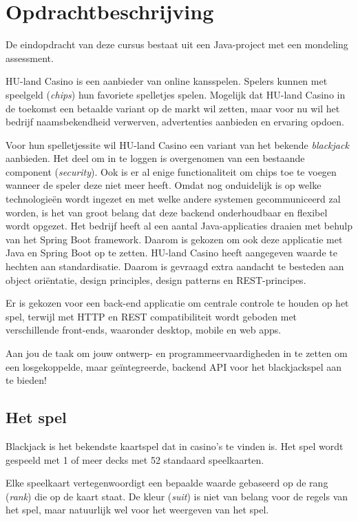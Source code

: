 \chapter{Opdrachtbeschrijving}

De eindopdracht van deze cursus bestaat uit een Java-project met een mondeling assessment.

HU-land Casino is een aanbieder van online kansspelen. 
Spelers kunnen met speelgeld (\textit{chips}) hun favoriete spelletjes spelen. 
Mogelijk dat HU-land Casino in de toekomst een betaalde variant op de markt wil zetten, 
maar voor nu wil het bedrijf naamsbekendheid verwerven, advertenties aanbieden en ervaring opdoen. 

Voor hun spelletjessite wil HU-land Casino een variant van het bekende \textit{blackjack} aanbieden. 
Het deel om in te loggen is overgenomen van een bestaande component (\textit{security}). 
Ook is er al enige functionaliteit om chips toe te voegen wanneer de speler deze niet meer heeft. 
Omdat nog onduidelijk is op welke technologieën wordt ingezet en met welke andere systemen gecommuniceerd zal worden, 
is het van groot belang dat deze backend onderhoudbaar en flexibel wordt opgezet. 
Het bedrijf heeft al een aantal Java-applicaties draaien met behulp van het Spring Boot framework. 
Daarom is gekozen om ook deze applicatie met Java en Spring Boot op te zetten. 
HU-land Casino heeft aangegeven waarde te hechten aan standardisatie. 
Daarom is gevraagd extra aandacht te besteden aan object oriëntatie, design principles, design patterns en REST-principes.

Er is gekozen voor een back-end applicatie om centrale controle 
te houden op het spel, terwijl met HTTP en REST compatibiliteit wordt 
geboden met verschillende front-ends, 
waaronder desktop, mobile en web apps.

Aan jou de taak om jouw ontwerp- en programmeervaardigheden in te zetten om 
een losgekoppelde, maar geïntegreerde, backend API voor het blackjackspel aan te bieden!

\newpage

\section{Het spel}
Blackjack is het bekendste kaartspel dat in casino's te vinden is.
Het spel wordt gespeeld met 1 of meer decks met 52 standaard speelkaarten.

Elke speelkaart vertegenwoordigt een bepaalde waarde gebaseerd 
op de rang (\textit{rank}) die op de kaart staat. 
De kleur (\textit{suit}) is niet van belang voor de regels 
van het spel, maar natuurlijk wel voor het weergeven van het spel.

